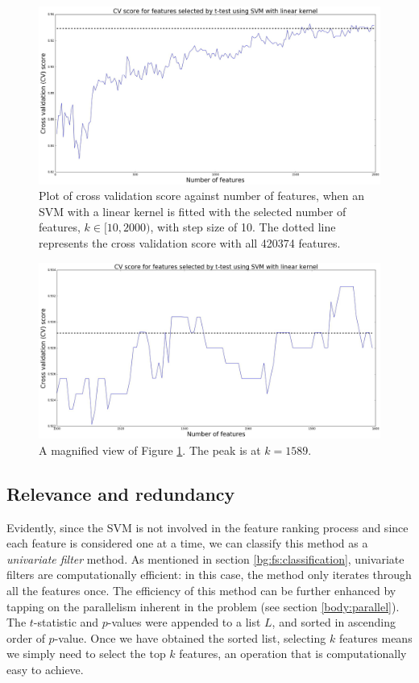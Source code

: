 \documentclass[12pt, twoside, a4paper]{report}
\begin{document}
\begin{figure}
\centering
\includegraphics[width=\textwidth]{images/t_test_2000_uneq_var1.jpeg}
\caption{Plot of cross validation score against number of features, when an SVM with a linear kernel is fitted with the selected number of features, $k \in [10, 2000)$, with step size of 10. The dotted line represents the cross validation score with all 420374 features.}
\label{body:t_test:fig}
\end{figure}

\begin{figure}
\centering
\includegraphics[width=\textwidth]{images/t_test_2000_uneq_var_zoom.jpeg}
\caption{A magnified view of Figure \ref{body:t_test:fig}. The peak is at $k=1589$.}
\label{body:t_test:fig_zoom}
\end{figure}


\subsection{Relevance and redundancy}

Evidently, since the SVM is not involved in the feature ranking process and since each feature is considered one at a time, we can classify this method as a \textit{univariate filter} method. As mentioned in section \ref{bg:fs:classification}, univariate filters are computationally efficient: in this case, the method only iterates through all the features once. The efficiency of this method can be further enhanced by tapping on the parallelism inherent in the problem (see section \ref{body:parallel}). The $t$-statistic and $p$-values were appended to a list $L$, and sorted in ascending order of $p$-value. Once we have obtained the sorted list, selecting $k$ features means we simply need to select the top $k$ features, an operation that is computationally easy to achieve.
\end{document}
